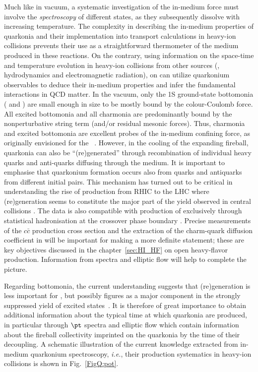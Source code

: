 \documentclass[../report.tex]{subfiles}
\begin{document}
Much like in vacuum, a systematic investigation of the in-medium force must involve the {\em spectroscopy} of different states, as they subsequently dissolve with increasing temperature. 
The complexity in describing the in-medium properties of quarkonia and their
implementation into transport calculations in heavy-ion collisions prevents their 
use as a straightforward thermometer of the medium produced in these reactions. 
On the contrary, using information on the space-time and temperature evolution in
heavy-ion collisions from other sources (\eg, hydrodynamics and electromagnetic 
radiation), on can utilize quarkonium observables to deduce their in-medium properties
and infer the fundamental interactions in QCD matter. 
In the vacuum, only the 1S ground-state bottomonia ( and \PGhb) are small enough in size to be mostly bound by the colour-Coulomb force. All excited bottomonia and all charmonia are predominantly bound by the nonperturbative string term (and/or residual mesonic forces). 
Thus, charmonia and excited bottomonia are excellent probes of the in-medium confining force, as originally envisioned for the \PJgy~\cite{Matsui:1986dk}.
However, in the cooling of the expanding fireball, quarkonia can also be ``(re)generated'' through recombination of individual heavy quarks and anti-quarks diffusing through the medium. It is important to emphasise that quarkonium formation occurs also from quarks and antiquarks from different initial pairs.
This mechanism \cite{BraunMunzinger:2000px,Thews:2000rj,Young:2008he} has turned out to be critical in understanding the rise of \PJgy production from RHIC to the LHC where (re)generation seems to constitute the major part of the yield observed in central \PbPb collisions \cite{Rapp:2017chc}.
The data is also compatible with production of \PJgy exclusively through statistical hadronisation at the crossover phase boundary \cite{Andronic:2017pug}.
Precise measurements of the $c\bar{c}$ production cross section and the extraction of the charm-quark diffusion coefficient in \RunsThreeFour will be important for making a more definite statement; these are key objectives discussed in the chapter~\ref{sec:HI_HF} on open heavy-flavor production. Information from \pt spectra and elliptic flow will help to complete the picture.

Regarding bottomonia, the current understanding suggests that (re)generation is less important for , but possibly figures as a major component in the strongly suppressed yield of excited states~\cite{Du:2017qkv,Krouppa:2017jlg}. It is therefore of great importance to obtain additional information about the typical time at which quarkonia are produced, in particular through $\pt$ spectra and elliptic flow which contain information about the fireball collectivity imprinted on the quarkonia by the time of their decoupling. A schematic illustration of the current knowledge extracted from in-medium quarkonium spectroscopy, {\it i.e.}, their production systematics in heavy-ion collisions is shown in Fig.~\ref{FigQ:pot}.        
\end{document}
